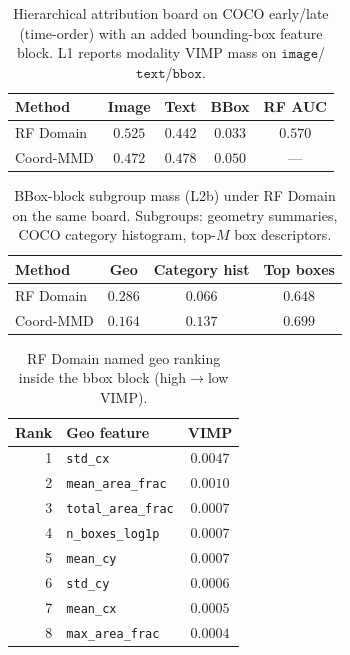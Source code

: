 
\begin{table}[ht]
\centering
\caption{Hierarchical attribution board on COCO early/late (time-order) with an added bounding-box feature block. L1 reports modality VIMP mass on $\texttt{image}$/$\texttt{text}$/$\texttt{bbox}$.}
\label{tab:bbox-attr-l1-mass}
\small
\begin{tabular}{@{}l ccc c@{}}
\toprule
Method & Image & Text & BBox & RF AUC \\
\midrule
RF Domain & $0.525$ & $0.442$ & $0.033$ & $0.570$ \\
Coord-MMD & $0.472$ & $0.478$ & $0.050$ & --- \\
\bottomrule
\end{tabular}
\end{table}

\begin{table}[ht]
\centering
\caption{BBox-block subgroup mass (L2b) under RF Domain on the same board. Subgroups: geometry summaries, COCO category histogram, top-$M$ box descriptors.}
\label{tab:bbox-attr-l2b-subgroups}
\small
\begin{tabular}{@{}l ccc@{}}
\toprule
Method & Geo & Category hist & Top boxes \\
\midrule
RF Domain & $0.286$ & $0.066$ & $0.648$ \\
Coord-MMD & $0.164$ & $0.137$ & $0.699$ \\
\bottomrule
\end{tabular}
\end{table}

\begin{table}[ht]
\centering
\caption{RF Domain named geo ranking inside the bbox block (high$\to$low VIMP).}
\label{tab:bbox-attr-geo-rank}
\small
\begin{tabular}{@{}r l c@{}}
\toprule
Rank & Geo feature & VIMP \\
\midrule
1 & \texttt{std_cx} & $0.0047$ \\
2 & \texttt{mean_area_frac} & $0.0010$ \\
3 & \texttt{total_area_frac} & $0.0007$ \\
4 & \texttt{n_boxes_log1p} & $0.0007$ \\
5 & \texttt{mean_cy} & $0.0007$ \\
6 & \texttt{std_cy} & $0.0006$ \\
7 & \texttt{mean_cx} & $0.0005$ \\
8 & \texttt{max_area_frac} & $0.0004$ \\
\bottomrule
\end{tabular}
\end{table}

